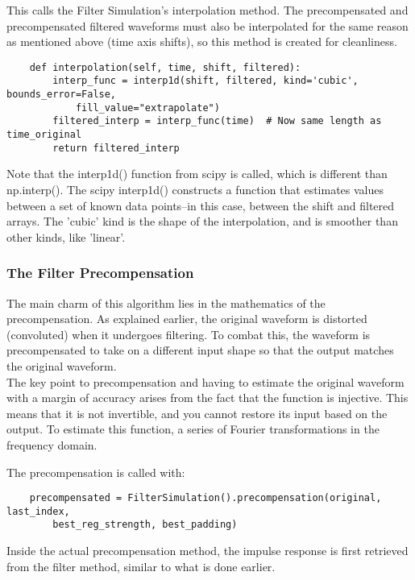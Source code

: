 \documentclass[11pt, a4paper]{article}
\theoremstyle{definition}
\numberwithin{equation}{section}
\begin{document}
This calls the Filter Simulation's interpolation method. The precompensated and precompensated filtered waveforms must also be interpolated for the same reason as mentioned above (time axis shifts), so this method is created for cleanliness. 

\begin{verbatim}
    def interpolation(self, time, shift, filtered):
        interp_func = interp1d(shift, filtered, kind='cubic', bounds_error=False, 
            fill_value="extrapolate")
        filtered_interp = interp_func(time)  # Now same length as time_original
        return filtered_interp
\end{verbatim}

Note that the interp1d() function from scipy is called, which is different than np.interp(). The scipy interp1d() constructs a function that estimates values between a set of known data points--in this case, between the shift and filtered arrays. The 'cubic' kind is the shape of the interpolation, and is smoother than other kinds, like 'linear'.

\subsubsection{The Filter Precompensation}

The main charm of this algorithm lies in the mathematics of the precompensation. As explained earlier, the original waveform is distorted (convoluted) when it undergoes filtering. To combat this, the waveform is precompensated to take on a different input shape so that the output matches the original waveform. 
\\
The key point to precompensation and having to estimate the original waveform with a margin of accuracy arises from the fact that the function is injective. This means that it is not invertible, and you cannot restore its input based on the output. To estimate this function, a series of Fourier transformations in the frequency domain. 

The precompensation is called with:

\begin{verbatim}
    precompensated = FilterSimulation().precompensation(original, last_index, 
        best_reg_strength, best_padding)
\end{verbatim}

Inside the actual precompensation method, the impulse response is first retrieved from the filter method, similar to what is done earlier.
\end{document}
